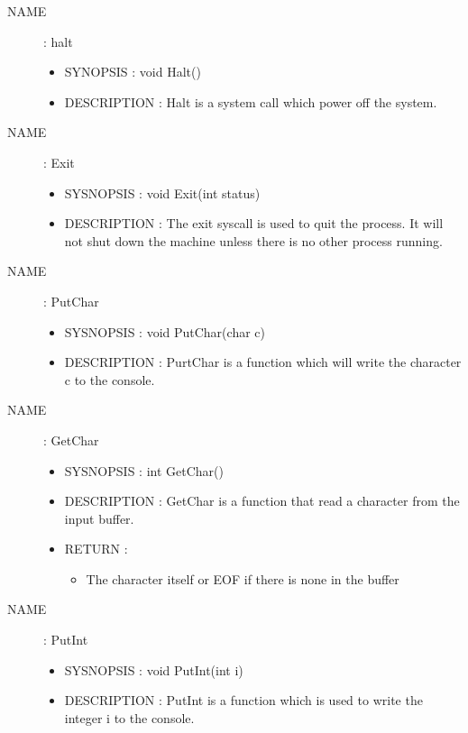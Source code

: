 \documentclass[a4paper,10pt]{article}
\begin{document}
\begin{description}
    \item [NAME] : halt
        \begin{itemize}
            \item SYNOPSIS : void Halt()
            \item DESCRIPTION :
                Halt is a system call which power off the system.
        \end{itemize}


    \item [NAME] : Exit
        \begin{itemize}
            \item SYSNOPSIS : void Exit(int status)
            \item DESCRIPTION :
                The exit syscall is used to quit the process. It will not shut down the
                machine unless there is no other process running.
        \end{itemize}

    \item [NAME] : PutChar
        \begin{itemize}
            \item SYSNOPSIS : void PutChar(char c)
            \item DESCRIPTION :
                PurtChar is a function which will write the character c to the console.
        \end{itemize}

    \item [NAME] : GetChar
        \begin{itemize}
            \item SYSNOPSIS : int GetChar()
            \item DESCRIPTION :
                GetChar is a function that read a character from the input buffer.
            \item RETURN :
                \begin{itemize}
                    \item The character itself or EOF if there is none in the buffer
                \end{itemize}
        \end{itemize}

    \item [NAME] : PutInt
        \begin{itemize}
            \item SYSNOPSIS : void PutInt(int i)
            \item DESCRIPTION :
                PutInt is a function which is used to write the integer i to the console.
        \end{itemize}


\end{description}
\end{document}
